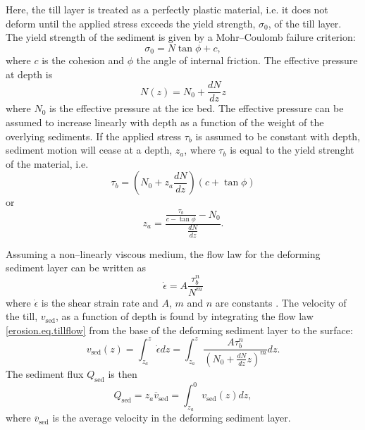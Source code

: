 Here, the till layer is treated as a perfectly plastic material, i.e. it does not deform until the applied stress exceeds the yield strength, $\sigma_0$, of the till layer. The yield strength of the sediment is given by a Mohr--Coulomb failure criterion:
\begin{equation}
  \sigma_0=N\tan\phi+c,
\end{equation}
where $c$ is the cohesion and $\phi$ the angle of internal friction. The effective pressure at depth is
\begin{equation}
  N(z)=N_0+\frac{dN}{dz}z
\end{equation}
where $N_0$ is the effective pressure at the ice bed. The effective pressure can be assumed to increase linearly with depth as a function of the weight of the overlying sediments. If the applied stress $\tau_b$ is assumed to be constant with depth, sediment motion will cease at a depth, $z_a$, where $\tau_b$ is equal to the yield strenght of the material, i.e.
\begin{equation}
  \tau_b=\left(N_0+z_a\frac{dN}{dz}\right)\left(c+\tan\phi\right)
\end{equation}
or
\begin{equation}
  \label{erosion.eq.sed_thick}
  z_a=\frac{ \frac{\tau_b}{c-\tan\phi}-N_0}{\frac{dN}{dz}}.
\end{equation}

Assuming a non--linearly viscous medium, the flow law for the deforming sediment layer can be written as
\begin{equation}
  \dot\epsilon=A\frac{\tau_b^n}{N^m}
  \label{erosion.eq.tillflow}
\end{equation}
where $\dot\epsilon$ is the shear strain rate and $A$, $m$ and $n$ are constants \citep{erosion.5}. The velocity of the till, $v_{\text{sed}}$, as a function of depth is found by integrating the flow law \eqref{erosion.eq.tillflow} from the base of the deforming sediment layer to the surface:
\begin{equation}
  \label{erosion.eq.tillvelo}
  v_{\text{sed}}(z)=\int_{z_a}^z\dot\epsilon dz=\int_{z_a}^z\frac{A\tau_b^n}{\left(N_0+\frac{dN}{dz}z\right)^m}dz.
\end{equation}
The sediment flux $Q_{\text{sed}}$ is then
\begin{equation}
  \label{erosion.eq.tillflux}
  Q_{\text{sed}}=z_a\overline{v}_{\text{sed}}=\int_{z_a}^0v_{\text{sed}}(z)dz,
\end{equation}
where $\overline{v}_{\text{sed}}$ is the average velocity in the deforming sediment layer.
